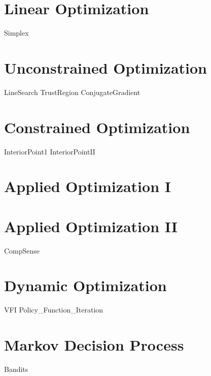 \documentclass[nociteref]{SIAM-GH-book}
\begin{document}
\part{Linear Optimization}
{Simplex}


\part{Unconstrained Optimization}
{LineSearch}
{TrustRegion}
{ConjugateGradient}

\part{Constrained Optimization}
{InteriorPoint1}
{InteriorPointII}

\part{Applied Optimization I}

\part{Applied Optimization II}
{CompSense}

\part{Dynamic Optimization}
{VFI}
{Policy_Function_Iteration}

\part{Markov Decision Process}
{Bandits}
\end{document}

